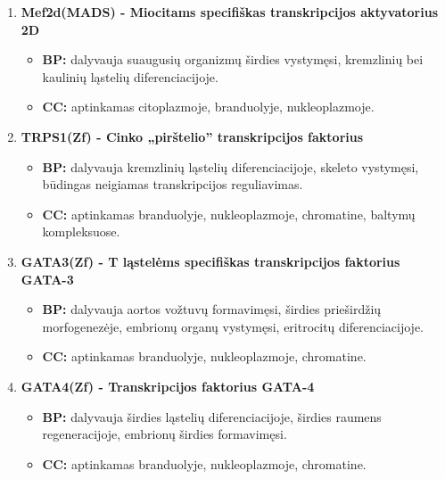 \documentclass[12pt]{article}
\begin{document}
\begin{enumerate}
    \item \textbf{Mef2d(MADS)\cite{MEF2D} - Miocitams specifiškas
                  transkripcijos aktyvatorius 2D}
        \begin{itemize}
            \item \textbf{BP:} dalyvauja suaugusių organizmų širdies vystymęsi,
                kremzlinių bei kaulinių ląstelių diferenciacijoje.
            \item \textbf{CC:} aptinkamas citoplazmoje, branduolyje,
                nukleoplazmoje.
        \end{itemize}

    \item \textbf{TRPS1(Zf)\cite{TRPS1} - Cinko „pirštelio”
                  transkripcijos faktorius}
        \begin{itemize}
            \item \textbf{BP:} dalyvauja kremzlinių ląstelių diferenciacijoje,
                skeleto vystymęsi, būdingas neigiamas transkripcijos
                reguliavimas.
            \item \textbf{CC:} aptinkamas branduolyje, nukleoplazmoje,
                chromatine, baltymų kompleksuose.
        \end{itemize}

    \item \textbf{GATA3(Zf)\cite{GATA3} - T ląstelėms specifiškas
                  transkripcijos faktorius GATA-3}
        \begin{itemize}
            \item \textbf{BP:} dalyvauja aortos vožtuvų formavimęsi, širdies
                prieširdžių morfogenezėje, embrionų organų vystymęsi,
                eritrocitų diferenciacijoje.
            \item \textbf{CC:} aptinkamas branduolyje, nukleoplazmoje,
                chromatine.
        \end{itemize}

    \item \textbf{GATA4(Zf)\cite{GATA4} - Transkripcijos faktorius GATA-4}
        \begin{itemize}
            \item \textbf{BP:} dalyvauja širdies ląstelių diferenciacijoje,
                širdies raumens regeneracijoje, embrionų širdies formavimęsi.
            \item \textbf{CC:} aptinkamas branduolyje, nukleoplazmoje,
                chromatine.
        \end{itemize}


\end{enumerate}
\end{document}
